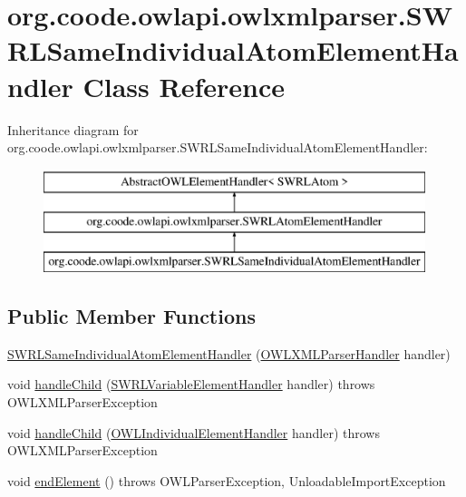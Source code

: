 \hypertarget{classorg_1_1coode_1_1owlapi_1_1owlxmlparser_1_1_s_w_r_l_same_individual_atom_element_handler}{\section{org.\-coode.\-owlapi.\-owlxmlparser.\-S\-W\-R\-L\-Same\-Individual\-Atom\-Element\-Handler Class Reference}
\label{classorg_1_1coode_1_1owlapi_1_1owlxmlparser_1_1_s_w_r_l_same_individual_atom_element_handler}
}
Inheritance diagram for org.\-coode.\-owlapi.\-owlxmlparser.\-S\-W\-R\-L\-Same\-Individual\-Atom\-Element\-Handler\-:\begin{figure}[H]
\begin{center}
\leavevmode
\includegraphics[height=3.000000cm]{classorg_1_1coode_1_1owlapi_1_1owlxmlparser_1_1_s_w_r_l_same_individual_atom_element_handler}
\end{center}
\end{figure}
\subsection*{Public Member Functions}
\begin{DoxyCompactItemize}
\item 
\hyperlink{classorg_1_1coode_1_1owlapi_1_1owlxmlparser_1_1_s_w_r_l_same_individual_atom_element_handler_a0df35dc16fc704da6e4cb3dd79dc09b9}{S\-W\-R\-L\-Same\-Individual\-Atom\-Element\-Handler} (\hyperlink{classorg_1_1coode_1_1owlapi_1_1owlxmlparser_1_1_o_w_l_x_m_l_parser_handler}{O\-W\-L\-X\-M\-L\-Parser\-Handler} handler)
\item 
void \hyperlink{classorg_1_1coode_1_1owlapi_1_1owlxmlparser_1_1_s_w_r_l_same_individual_atom_element_handler_a6be5fbab9b3fba9636605a77f1cd8f18}{handle\-Child} (\hyperlink{classorg_1_1coode_1_1owlapi_1_1owlxmlparser_1_1_s_w_r_l_variable_element_handler}{S\-W\-R\-L\-Variable\-Element\-Handler} handler)  throws O\-W\-L\-X\-M\-L\-Parser\-Exception 
\item 
void \hyperlink{classorg_1_1coode_1_1owlapi_1_1owlxmlparser_1_1_s_w_r_l_same_individual_atom_element_handler_a7952fda715f3e2c4d958ec5ed60020cb}{handle\-Child} (\hyperlink{classorg_1_1coode_1_1owlapi_1_1owlxmlparser_1_1_o_w_l_individual_element_handler}{O\-W\-L\-Individual\-Element\-Handler} handler)  throws O\-W\-L\-X\-M\-L\-Parser\-Exception 
\item 
void \hyperlink{classorg_1_1coode_1_1owlapi_1_1owlxmlparser_1_1_s_w_r_l_same_individual_atom_element_handler_af6619975bef3e4f75f02401085c9cacd}{end\-Element} ()  throws O\-W\-L\-Parser\-Exception, Unloadable\-Import\-Exception 
\end{DoxyCompactItemize}
